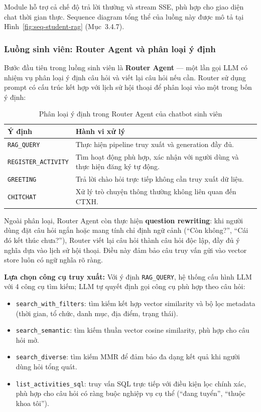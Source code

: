 Module hỗ trợ cả chế độ trả lời thường và stream SSE, phù hợp cho giao diện chat thời gian thực. Sequence diagram tổng thể của luồng này được mô tả tại Hình~\ref{fig:seq-student-rag} (Mục~3.4.7).

\subsubsection{Luồng sinh viên: Router Agent và phân loại ý định}
Bước đầu tiên trong luồng sinh viên là \textbf{Router Agent} — một lần gọi LLM có nhiệm vụ phân loại ý định câu hỏi và viết lại câu hỏi nếu cần. Router sử dụng prompt có cấu trúc kết hợp với lịch sử hội thoại để phân loại vào một trong bốn ý định:

\begin{table}[H]
\centering
\renewcommand{\arraystretch}{1.25}
\begin{tabular}{|p{3.8cm}|p{10.5cm}|}
\hline
\textbf{Ý định} & \textbf{Hành vi xử lý} \\
\hline
\texttt{RAG\_QUERY} & Thực hiện pipeline truy xuất và generation đầy đủ. \\
\hline
\texttt{REGISTER\_ACTIVITY} & Tìm hoạt động phù hợp, xác nhận với người dùng và thực hiện đăng ký tự động. \\
\hline
\texttt{GREETING} & Trả lời chào hỏi trực tiếp không cần truy xuất dữ liệu. \\
\hline
\texttt{CHITCHAT} & Xử lý trò chuyện thông thường không liên quan đến CTXH. \\
\hline
\end{tabular}
\caption{Phân loại ý định trong Router Agent của chatbot sinh viên}
\end{table}

Ngoài phân loại, Router Agent còn thực hiện \textbf{question rewriting}: khi người dùng đặt câu hỏi ngắn hoặc mang tính chỉ định ngữ cảnh (``Còn không?'', ``Cái đó kết thúc chưa?''), Router viết lại câu hỏi thành câu hỏi độc lập, đầy đủ ý nghĩa dựa vào lịch sử hội thoại. Điều này đảm bảo câu truy vấn gửi vào vector store luôn có ngữ nghĩa rõ ràng.

\textbf{Lựa chọn công cụ truy xuất:} Với ý định \texttt{RAG\_QUERY}, hệ thống cấu hình LLM với 4 công cụ tìm kiếm; LLM tự quyết định gọi công cụ phù hợp theo câu hỏi:
\begin{itemize}
	\item \texttt{search\_with\_filters}: tìm kiếm kết hợp vector similarity và bộ lọc metadata (thời gian, tổ chức, danh mục, địa điểm, trạng thái).
	\item \texttt{search\_semantic}: tìm kiếm thuần vector cosine similarity, phù hợp cho câu hỏi mở.
	\item \texttt{search\_diverse}: tìm kiếm MMR để đảm bảo đa dạng kết quả khi người dùng hỏi tổng quát.
	\item \texttt{list\_activities\_sql}: truy vấn SQL trực tiếp với điều kiện lọc chính xác, phù hợp cho câu hỏi có ràng buộc nghiệp vụ cụ thể (``đang tuyển'', ``thuộc khoa tôi'').
\end{itemize}

